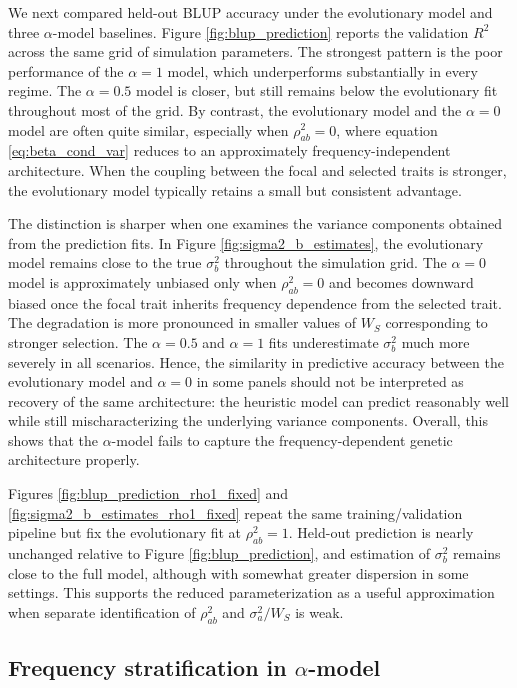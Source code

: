 \documentclass[10pt]{article}
\begin{document}
We next compared held-out BLUP accuracy under the evolutionary model and three $\alpha$-model baselines. 
Figure \ref{fig:blup_prediction} reports the validation $R^2$ across the same grid of simulation parameters. 
The strongest pattern is the poor performance of the $\alpha=1$ model, 
which underperforms substantially in every regime. 
The $\alpha=0.5$ model is closer, but still remains below the evolutionary fit throughout most of the grid. 
By contrast, the evolutionary model and the $\alpha=0$ model are often quite similar, especially when $\rho_{ab}^2=0$, 
where equation \ref{eq:beta_cond_var} reduces to an approximately frequency-independent architecture. 
When the coupling between the focal and selected traits is stronger, the evolutionary model typically retains a small but consistent advantage.


The distinction is sharper when one examines the variance components obtained from the prediction fits. 
In Figure \ref{fig:sigma2_b_estimates}, the evolutionary model remains close to the true $\sigma_b^2$ throughout the simulation grid. 
The $\alpha=0$ model is approximately unbiased only when $\rho_{ab}^2=0$ and becomes downward biased once the focal trait inherits frequency dependence from the selected trait. 
The degradation is more pronounced in smaller values of $W_S$ corresponding to stronger selection.
The $\alpha=0.5$ and $\alpha=1$ fits underestimate $\sigma_b^2$ much more severely in all scenarios. 
Hence, the similarity in predictive accuracy between the evolutionary model and $\alpha=0$ in some panels should not be interpreted as recovery of the same architecture: the heuristic model can predict reasonably well while still mischaracterizing the underlying variance components.
Overall, this shows that the $\alpha$-model fails to capture the frequency-dependent genetic architecture properly.

Figures \ref{fig:blup_prediction_rho1_fixed} and \ref{fig:sigma2_b_estimates_rho1_fixed} repeat the same training/validation pipeline but fix the evolutionary fit at $\rho_{ab}^2=1$. 
Held-out prediction is nearly unchanged relative to Figure \ref{fig:blup_prediction}, 
and estimation of $\sigma_b^2$ remains close to the full model, 
although with somewhat greater dispersion in some settings. 
This supports the reduced parameterization as a useful approximation when separate identification of $\rho_{ab}^2$ and $\sigma_a^2 / W_S$ is weak.

\subsection{Frequency stratification in \texorpdfstring{$\alpha$}{}-model}
\end{document}
